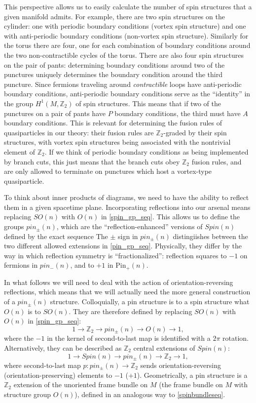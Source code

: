 \documentclass[12pt,a4paper]{article}
\newcounter{arrow}
\newcommand{\ra}{\rightarrow}
\newcommand{\zt}{\mathbb{Z}_2}
\newcommand\be            {\begin{equation}}
\newcommand\ee            {\end{equation}}
\newcommand{\pin}{\text{Pin}}
\begin{document}
This perspective allows us to easily calculate the number of spin structures that a given manifold admits. 
For example, there are two spin structures on the cylinder: one with periodic boundary conditions (vortex 
spin structure) and one with anti-periodic boundary conditions (non-vortex spin structure). Similarly for the 
torus there are four, one for each combination of boundary conditions around the two non-contractible 
cycles of the torus. There are also four spin structures on the pair of pants: determining boundary 
conditions around two of the punctures uniquely determines the boundary condition around the third 
puncture. Since fermions traveling around {\it contractible} loops have anti-periodic boundary conditions, 
anti-periodic boundary conditions serve as the ``identity'' in the group $H^1(M,\zt)$ of spin structures. This 
means that if two of the punctures on a pair of pants have $P$ boundary conditions, the third must have 
$A$ boundary conditions. This is relevant for determining the fusion rules of quasiparticles in our theory: 
their fusion rules are $\zt$-graded by their spin structures, with vortex spin structures being associated 
with the nontrivial element of $\zt$. If we think of periodic boundary conditions as being implemented by 
branch cuts, this just means that the branch cuts obey $\zt$ fusion rules, and are only allowed to terminate 
on punctures which host a vortex-type quasiparticle. 


To think about inner products of diagrams, we need to have the ability to reflect them in a given spacetime plane. Incorporating reflections into our arsenal means replacing $SO(n)$ with $O(n)$ in \eqref{spin_gp_seq}. This allows us to define the groups $pin_\pm(n)$, which are the ``reflection-enhanced'' versions of $Spin(n)$ defined by the exact sequence 
 The $\pm$ sign in $pin_\pm(n)$ distingiishes between the two different allowed extensions in \eqref{pin_gp_seq}. Physically, they differ by the way in which reflection symmetry is ``fractionalized'': reflection squares to $-1$ on fermions in $pin_-(n)$, and to $+1$ in $\pin_+(n)$. 


In what follows we will need to deal with the action of orientation-reversing reflections, which means that we will actually need the more general construction of a $pin_\pm(n)$ structure. Colloquially, a pin structure is to a spin structure what $O(n)$ is to $SO(n)$. They are therefore defined by replacing $SO(n)$ with $O(n)$ in \eqref{spin_gp_seq}:
\be \label{pin_gp_seq} 1 \ra \zt \ra pin_\pm(n) \ra O(n) \ra 1,\ee
where the $-1$ in the kernel of second-to-last map is identified with a $2\pi$ rotation.
Alternatively, they can be described as $\zt$ central extensions of $Spin(n)$:
\be \label{pinseq} 1\ra Spin(n) \ra pin_\pm(n) \ra \zt \ra 1,\ee 
where second-to-last map $p : pin_\pm(n) \ra \zt$ sends orientation-reversing (orientation-preserving) elements to $-1$ ($+1$). Geometrically, a pin structure is a $\zt$ extension of the unoriented frame bundle on $M$ (the frame bundle on $M$ with structure group $O(n)$), defined in an analogous way to \eqref{spinbundleseq}.
\end{document}
